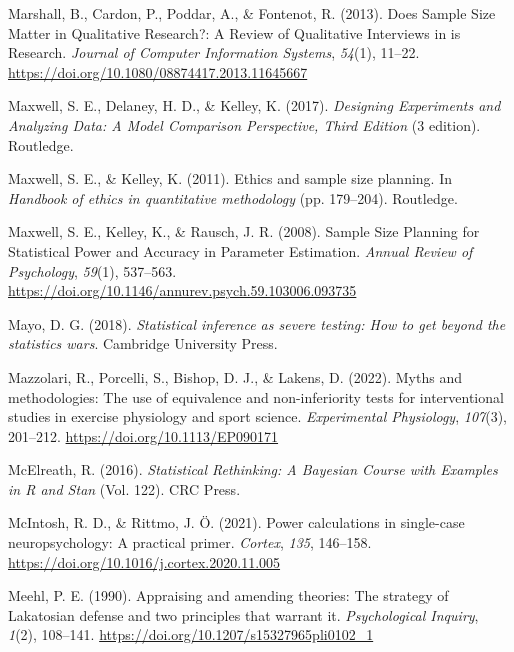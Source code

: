 \documentclass[
  letterpaper,
  DIV=11,
  numbers=noendperiod]{scrreprt}
\newlength{\cslhangindent}
\newlength{\cslentryspacingunit} %
\newenvironment{CSLReferences}[2] %
 {%
  \setlength{\parindent}{0pt}
  \ifodd #1
  \let\oldpar\par
  \def\par{\hangindent=\cslhangindent\oldpar}
  \fi
  \setlength{\parskip}{#2\cslentryspacingunit}
 }%
 {}
\begin{document}
\begin{CSLReferences}{1}{0}
\leavevmode{}%
Marshall, B., Cardon, P., Poddar, A., \& Fontenot, R. (2013). Does
{Sample Size Matter} in {Qualitative Research}?: {A Review} of
{Qualitative Interviews} in is {Research}. \emph{Journal of Computer
Information Systems}, \emph{54}(1), 11--22.
\url{https://doi.org/10.1080/08874417.2013.11645667}

\leavevmode{}%
Maxwell, S. E., Delaney, H. D., \& Kelley, K. (2017). \emph{Designing
{Experiments} and {Analyzing Data}: {A Model Comparison Perspective},
{Third Edition}} (3 edition). {Routledge}.

\leavevmode{}%
Maxwell, S. E., \& Kelley, K. (2011). Ethics and sample size planning.
In \emph{Handbook of ethics in quantitative methodology} (pp. 179--204).
{Routledge}.

\leavevmode{}%
Maxwell, S. E., Kelley, K., \& Rausch, J. R. (2008). Sample {Size
Planning} for {Statistical Power} and {Accuracy} in {Parameter
Estimation}. \emph{Annual Review of Psychology}, \emph{59}(1), 537--563.
\url{https://doi.org/10.1146/annurev.psych.59.103006.093735}

\leavevmode{}%
Mayo, D. G. (2018). \emph{Statistical inference as severe testing: How
to get beyond the statistics wars}. {Cambridge University Press}.

\leavevmode{}%
Mazzolari, R., Porcelli, S., Bishop, D. J., \& Lakens, D. (2022). Myths
and methodologies: {The} use of equivalence and non-inferiority tests
for interventional studies in exercise physiology and sport science.
\emph{Experimental Physiology}, \emph{107}(3), 201--212.
\url{https://doi.org/10.1113/EP090171}

\leavevmode{}%
McElreath, R. (2016). \emph{Statistical {Rethinking}: {A Bayesian
Course} with {Examples} in {R} and {Stan}} (Vol. 122). {CRC Press}.

\leavevmode{}%
McIntosh, R. D., \& Rittmo, J. Ö. (2021). Power calculations in
single-case neuropsychology: {A} practical primer. \emph{Cortex},
\emph{135}, 146--158. \url{https://doi.org/10.1016/j.cortex.2020.11.005}

\leavevmode{}%
Meehl, P. E. (1990). Appraising and amending theories: {The} strategy of
{Lakatosian} defense and two principles that warrant it.
\emph{Psychological Inquiry}, \emph{1}(2), 108--141.
\url{https://doi.org/10.1207/s15327965pli0102_1}


\end{CSLReferences}
\end{document}
